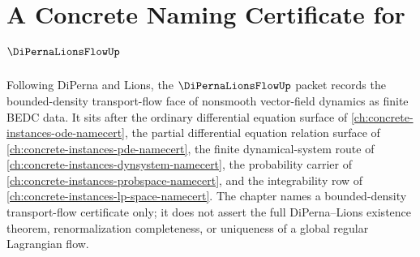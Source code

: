 \chapter{A Concrete Naming Certificate for $\DiPernaLionsFlowUp$}
\label{ch:concrete-instances-di-perna-lions-flow-namecert}

Following DiPerna and Lions, the $\DiPernaLionsFlowUp$ packet records the bounded-density transport-flow face of nonsmooth vector-field dynamics as finite BEDC data. It sits after the ordinary differential equation surface of \autoref{ch:concrete-instances-ode-namecert}, the partial differential equation relation surface of \autoref{ch:concrete-instances-pde-namecert}, the finite dynamical-system route of \autoref{ch:concrete-instances-dynsystem-namecert}, the probability carrier of \autoref{ch:concrete-instances-probspace-namecert}, and the integrability row of \autoref{ch:concrete-instances-lp-space-namecert}. The chapter names a bounded-density transport-flow certificate only; it does not assert the full DiPerna--Lions existence theorem, renormalization completeness, or uniqueness of a global regular Lagrangian flow.

